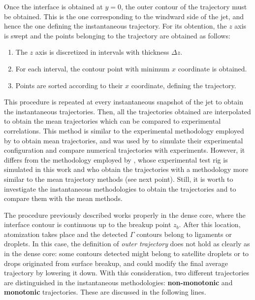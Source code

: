 Once the interface is obtained at $y = 0$, the outer contour of the trajectory must be obtained. This is the one corresponding to the windward side of the jet, and hence the one defining the instantaneous trajectory. For its obtention, the $z$ axis is swept and the points belonging to the trajectory are obtained as follows:

\begin{enumerate}

	\item The $z$ axis is discretized in intervals with thickness $\Delta z$. 
	
	\item For each interval, the contour point with minimum $x$ coordinate is obtained.
	
	\item Points are sorted according to their $x$ coordinate, defining the trajectory.

\end{enumerate}

This procedure is repeated at every instantaneous snapshot of the jet to obtain the instantaneous trajectories. Then, all the trajectories obtained are interpolated to obtain the mean trajectories which can be compared to experimental correlations. This method is similar to the experimental methodology employed by  to obtain mean trajectories, and was used by  to simulate their experimental configuration and compare numerical trajectories with experiments. However, it differs from the methodology employed by , whose experimental test rig is simulated in this work and who obtain the trajectories with a methodology more similar to the mean trajectory methods (see next point). Still, it is worth to investigate the instantaneous methodologies to obtain the trajectories and to compare them with the mean methods.

The procedure previously described works properly in the dense core, where the interface contour is continuous up to the breakup point $z_b$. After this location, atomization takes place and the detected $\Gamma$ contours belong to ligaments or droplets. In this case, the definition of \textsl{outer trajectory} does not hold as clearly as in the dense core: some contours detected might belong to satellite droplets or to drops originated from surface breakup, and could modify the final average trajectory by lowering it down. With this consideration, two different trajectories are distinguished in the instantaneous methodologies: \textbf{non-monotonic} and \textbf{monotonic} trajectories. These are discussed in the following lines.

